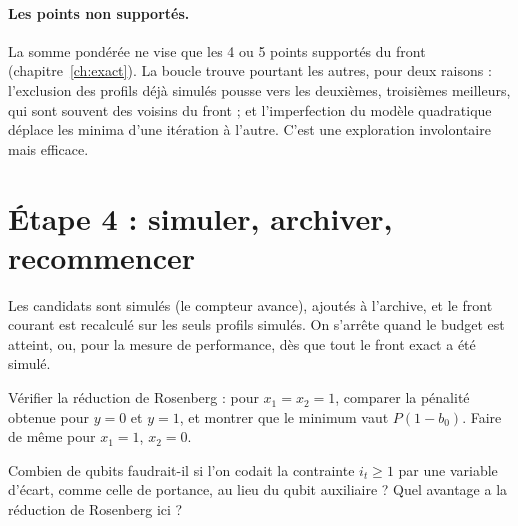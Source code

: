 \paragraph{Les points non supportés.} La somme pondérée ne vise que les 4 ou 5 points supportés du front (chapitre~\ref{ch:exact}). La boucle trouve pourtant les autres, pour deux raisons : l'exclusion des profils déjà simulés pousse vers les deuxièmes, troisièmes meilleurs, qui sont souvent des voisins du front ; et l'imperfection du modèle quadratique déplace les minima d'une itération à l'autre. C'est une exploration involontaire mais efficace.

\section{Étape 4 : simuler, archiver, recommencer}
Les candidats sont simulés (le compteur avance), ajoutés à l'archive, et le front courant est recalculé sur les seuls profils simulés. On s'arrête quand le budget est atteint, ou, pour la mesure de performance, dès que tout le front exact a été simulé.

\exercices
\begin{exercice}
Vérifier la réduction de Rosenberg : pour $x_1=x_2=1$, comparer la pénalité obtenue pour $y=0$ et $y=1$, et montrer que le minimum vaut $P(1-b_0)$. Faire de même pour $x_1=1$, $x_2=0$.
\end{exercice}
\begin{exercice}
Combien de qubits faudrait-il si l'on codait la contrainte $i_t\ge1$ par une variable d'écart, comme celle de portance, au lieu du qubit auxiliaire ? Quel avantage a la réduction de Rosenberg ici ?
\end{exercice}

